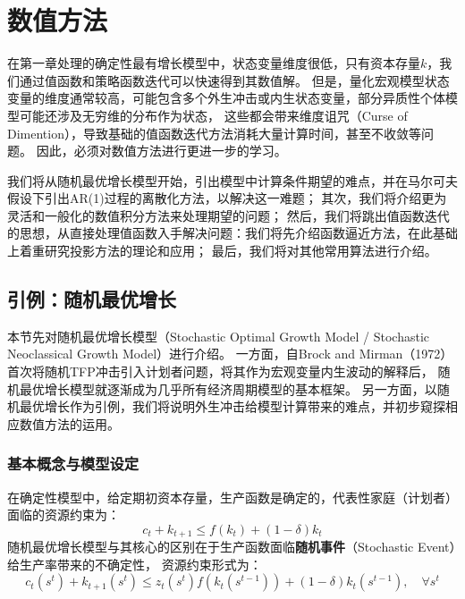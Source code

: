 

\chapter{数值方法}

在第一章处理的确定性最有增长模型中，状态变量维度很低，只有资本存量$k$，我们通过值函数和策略函数迭代可以快速得到其数值解。
但是，量化宏观模型状态变量的维度通常较高，可能包含多个外生冲击或内生状态变量，部分异质性个体模型可能还涉及无穷维的分布作为状态，
这些都会带来维度诅咒（Curse of Dimention），导致基础的值函数迭代方法消耗大量计算时间，甚至不收敛等问题。
因此，必须对数值方法进行更进一步的学习。

我们将从随机最优增长模型开始，引出模型中计算条件期望的难点，并在马尔可夫假设下引出AR(1)过程的离散化方法，以解决这一难题；
其次，我们将介绍更为灵活和一般化的数值积分方法来处理期望的问题；
然后，我们将跳出值函数迭代的思想，从直接处理值函数入手解决问题：我们将先介绍函数逼近方法，在此基础上着重研究投影方法的理论和应用；
最后，我们将对其他常用算法进行介绍。


\section{引例：随机最优增长}

本节先对随机最优增长模型（Stochastic Optimal Growth Model / Stochastic Neoclassical Growth Model）进行介绍。
一方面，自Brock and Mirman（1972）首次将随机TFP冲击引入计划者问题，将其作为宏观变量内生波动的解释后，
随机最优增长模型就逐渐成为几乎所有经济周期模型的基本框架。
另一方面，以随机最优增长作为引例，我们将说明外生冲击给模型计算带来的难点，并初步窥探相应数值方法的运用。


\subsection{基本概念与模型设定}

在确定性模型中，给定期初资本存量，生产函数是确定的，代表性家庭（计划者）面临的资源约束为：
\begin{equation*}
    c_t + k_{t+1} \leq f(k_t)+\left(1-\delta\right)k_t
\end{equation*}
随机最优增长模型与其核心的区别在于生产函数面临\textbf{随机事件}（Stochastic Event）给生产率带来的不确定性，
资源约束形式为：
\begin{equation*}  
    c_t\left(s^t\right)+k_{t+1}\left(s^t\right) \leq z_t\left(s^t\right) f\left(k_t\left(s^{t-1}\right)\right)
    +\left(1-\delta\right)k_t\left(s^{t-1}\right), \quad \forall s^t
\end{equation*}

